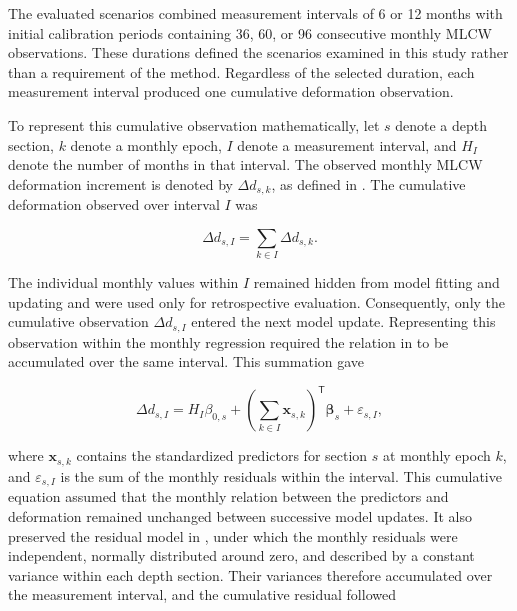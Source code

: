 The evaluated scenarios combined measurement intervals of 6 or 12 months with initial calibration periods containing 36, 60, or 96 consecutive monthly MLCW observations. These durations defined the scenarios examined in this study rather than a requirement of the method. Regardless of the selected duration, each measurement interval produced one cumulative deformation observation.

To represent this cumulative observation mathematically, let $s$ denote a depth section, $k$ denote a monthly epoch, $I$ denote a measurement interval, and $H_I$ denote the number of months in that interval. The observed monthly MLCW deformation increment is denoted by $\Delta d_{s,k}$, as defined in . The cumulative deformation observed over interval $I$ was

\begin{equation}
\Delta d_{s,I}
=
\sum_{k\in I}\Delta d_{s,k}.
\label{eq:cumulative_deformation_observation}
\end{equation}

The individual monthly values within $I$ remained hidden from model fitting and updating and were used only for retrospective evaluation. Consequently, only the cumulative observation $\Delta d_{s,I}$ entered the next model update. Representing this observation within the monthly regression required the relation in  to be accumulated over the same interval. This summation gave

\begin{equation}
\Delta d_{s,I}
=
H_I\beta_{0,s}
+
\left(
\sum_{k\in I}\boldsymbol{x}_{s,k}
\right)^{\mathsf{T}}
\boldsymbol{\beta}_{s}
+
\varepsilon_{s,I},
\label{eq:cumulative_deformation_model}
\end{equation}

where $\boldsymbol{x}_{s,k}$ contains the standardized predictors for section $s$ at monthly epoch $k$, and $\varepsilon_{s,I}$ is the sum of the monthly residuals within the interval. This cumulative equation assumed that the monthly relation between the predictors and deformation remained unchanged between successive model updates. It also preserved the residual model in , under which the monthly residuals were independent, normally distributed around zero, and described by a constant variance within each depth section. Their variances therefore accumulated over the measurement interval, and the cumulative residual followed

